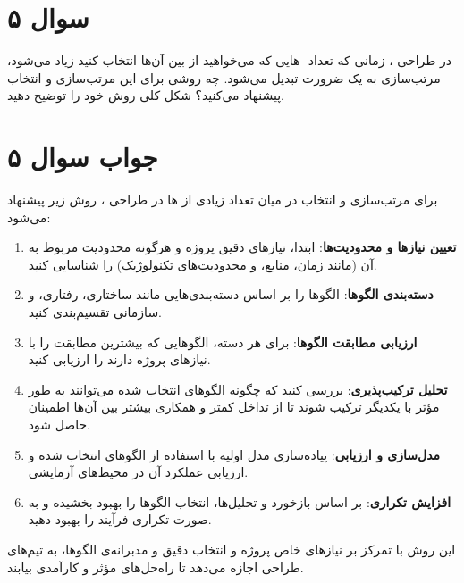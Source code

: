 \section*{سوال ۵}

در طراحی
، زمانی که تعداد
‌
هایی که می‌خواهید از بین آن‌ها انتخاب کنید زیاد می‌شود، مرتب‌سازی به یک ضرورت تبدیل می‌شود. چه روشی برای این مرتب‌سازی و انتخاب پیشنهاد می‌کنید؟ شکل کلی روش خود را توضیح دهید.


\section*{جواب سوال ۵}

برای مرتب‌سازی و انتخاب در میان تعداد زیادی از
ها در طراحی
، روش زیر پیشنهاد می‌شود:

\begin{enumerate}
	\item \textbf{تعیین نیازها و محدودیت‌ها}: ابتدا، نیازهای دقیق پروژه و هرگونه محدودیت مربوط به آن (مانند زمان، منابع، و محدودیت‌های تکنولوژیک) را شناسایی کنید.
	
	\item \textbf{دسته‌بندی الگوها}: الگوها را بر اساس دسته‌بندی‌هایی مانند ساختاری، رفتاری، و سازمانی تقسیم‌بندی کنید.
	
	\item \textbf{ارزیابی مطابقت الگوها}: برای هر دسته، الگوهایی که بیشترین مطابقت را با نیازهای پروژه دارند را ارزیابی کنید.
	
	\item \textbf{تحلیل ترکیب‌پذیری}: بررسی کنید که چگونه الگوهای انتخاب شده می‌توانند به طور مؤثر با یکدیگر ترکیب شوند تا از تداخل کمتر و همکاری بیشتر بین آن‌ها اطمینان حاصل شود.
	
	\item \textbf{مدل‌سازی و ارزیابی}: پیاده‌سازی مدل اولیه با استفاده از الگوهای انتخاب شده و ارزیابی عملکرد آن در محیط‌های آزمایشی.
	
	\item \textbf{افزایش تکراری}: بر اساس بازخورد و تحلیل‌ها، انتخاب الگوها را بهبود بخشیده و به صورت تکراری فرآیند را بهبود دهید.
\end{enumerate}

این روش با تمرکز بر نیازهای خاص پروژه و انتخاب دقیق و مدبرانه‌ی الگوها، به تیم‌های طراحی اجازه می‌دهد تا راه‌حل‌های مؤثر و کارآمدی بیابند.